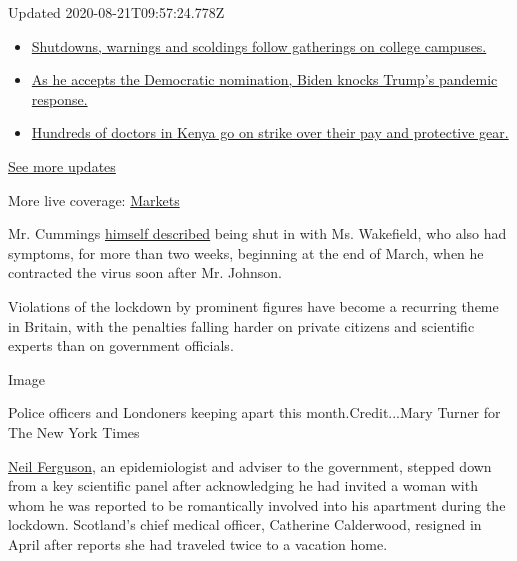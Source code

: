 Updated 2020-08-21T09:57:24.778Z

\begin{itemize}
\tightlist
\item
  \href{https://www.nytimes3xbfgragh.onion/2020/08/21/world/covid-19-coronavirus.html?action=click\&pgtype=Article\&state=default\&region=MAIN_CONTENT_1\&context=storylines_live_updates\#link-4690b6aa}{Shutdowns,
  warnings and scoldings follow gatherings on college campuses.}
\item
  \href{https://www.nytimes3xbfgragh.onion/2020/08/21/world/covid-19-coronavirus.html?action=click\&pgtype=Article\&state=default\&region=MAIN_CONTENT_1\&context=storylines_live_updates\#link-324af071}{As
  he accepts the Democratic nomination, Biden knocks Trump's pandemic
  response.}
\item
  \href{https://www.nytimes3xbfgragh.onion/2020/08/21/world/covid-19-coronavirus.html?action=click\&pgtype=Article\&state=default\&region=MAIN_CONTENT_1\&context=storylines_live_updates\#link-35890b73}{Hundreds
  of doctors in Kenya go on strike over their pay and protective gear.}
\end{itemize}

\href{https://www.nytimes3xbfgragh.onion/2020/08/21/world/covid-19-coronavirus.html?action=click\&pgtype=Article\&state=default\&region=MAIN_CONTENT_1\&context=storylines_live_updates}{See
more updates}

More live coverage:
\href{https://www.nytimes3xbfgragh.onion/live/2020/08/20/business/stock-market-today-coronavirus?action=click\&pgtype=Article\&state=default\&region=MAIN_CONTENT_1\&context=storylines_live_updates}{Markets}

Mr. Cummings
\href{https://www.spectator.co.uk/article/spectator-writers-in-lockdown-by-the-people-stuck-with-them}{himself
described} being shut in with Ms. Wakefield, who also had symptoms, for
more than two weeks, beginning at the end of March, when he contracted
the virus soon after Mr. Johnson.

Violations of the lockdown by prominent figures have become a recurring
theme in Britain, with the penalties falling harder on private citizens
and scientific experts than on government officials.

Image

Police officers and Londoners keeping apart this month.Credit...Mary
Turner for The New York Times

\href{https://www.nytimes3xbfgragh.onion/2020/05/05/world/coronavirus-world-coverage.html}{Neil
Ferguson}, an epidemiologist and adviser to the government, stepped down
from a key scientific panel after acknowledging he had invited a woman
with whom he was reported to be romantically involved into his apartment
during the lockdown. Scotland's chief medical officer, Catherine
Calderwood, resigned in April after reports she had traveled twice to a
vacation home.

